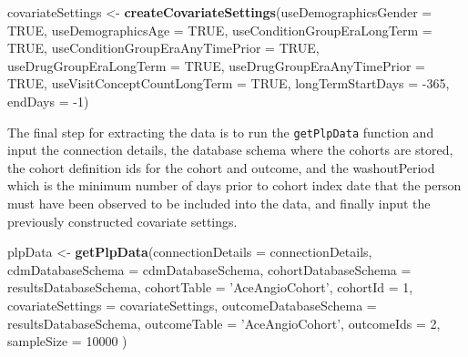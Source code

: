 \documentclass[
]{article}
\newenvironment{Shaded}{\begin{snugshade}}{\end{snugshade}}
\newcommand{\DataTypeTok}[1]{\textcolor[rgb]{0.13,0.29,0.53}{#1}}
\newcommand{\DecValTok}[1]{\textcolor[rgb]{0.00,0.00,0.81}{#1}}
\newcommand{\KeywordTok}[1]{\textcolor[rgb]{0.13,0.29,0.53}{\textbf{#1}}}
\newcommand{\NormalTok}[1]{#1}
\newcommand{\OtherTok}[1]{\textcolor[rgb]{0.56,0.35,0.01}{#1}}
\newcommand{\StringTok}[1]{\textcolor[rgb]{0.31,0.60,0.02}{#1}}
\begin{document}
\begin{Shaded}
\begin{Highlighting}[]
\NormalTok{    covariateSettings <-}\StringTok{ }\KeywordTok{createCovariateSettings}\NormalTok{(}\DataTypeTok{useDemographicsGender =} \OtherTok{TRUE}\NormalTok{,}
                                                 \DataTypeTok{useDemographicsAge =} \OtherTok{TRUE}\NormalTok{,}
                                                 \DataTypeTok{useConditionGroupEraLongTerm =} \OtherTok{TRUE}\NormalTok{,}
                                                 \DataTypeTok{useConditionGroupEraAnyTimePrior =} \OtherTok{TRUE}\NormalTok{,}
                                                 \DataTypeTok{useDrugGroupEraLongTerm =} \OtherTok{TRUE}\NormalTok{,}
                                                 \DataTypeTok{useDrugGroupEraAnyTimePrior =} \OtherTok{TRUE}\NormalTok{,}
                                                 \DataTypeTok{useVisitConceptCountLongTerm =} \OtherTok{TRUE}\NormalTok{,}
                                                 \DataTypeTok{longTermStartDays =} \DecValTok{-365}\NormalTok{,}
                                                 \DataTypeTok{endDays =} \DecValTok{-1}\NormalTok{)}
\end{Highlighting}
\end{Shaded}

The final step for extracting the data is to run the \texttt{getPlpData}
function and input the connection details, the database schema where the
cohorts are stored, the cohort definition ids for the cohort and
outcome, and the washoutPeriod which is the minimum number of days prior
to cohort index date that the person must have been observed to be
included into the data, and finally input the previously constructed
covariate settings.

\begin{Shaded}
\begin{Highlighting}[]
\NormalTok{    plpData <-}\StringTok{ }\KeywordTok{getPlpData}\NormalTok{(}\DataTypeTok{connectionDetails =}\NormalTok{ connectionDetails,}
                          \DataTypeTok{cdmDatabaseSchema =}\NormalTok{ cdmDatabaseSchema,}
                          \DataTypeTok{cohortDatabaseSchema =}\NormalTok{ resultsDatabaseSchema,}
                          \DataTypeTok{cohortTable =} \StringTok{'AceAngioCohort'}\NormalTok{,}
                          \DataTypeTok{cohortId =} \DecValTok{1}\NormalTok{,}
                          \DataTypeTok{covariateSettings =}\NormalTok{ covariateSettings,}
                          \DataTypeTok{outcomeDatabaseSchema =}\NormalTok{ resultsDatabaseSchema,}
                          \DataTypeTok{outcomeTable =} \StringTok{'AceAngioCohort'}\NormalTok{,}
                          \DataTypeTok{outcomeIds =} \DecValTok{2}\NormalTok{,}
                          \DataTypeTok{sampleSize =} \DecValTok{10000}
\NormalTok{    )}
\end{Highlighting}
\end{Shaded}
\end{document}
